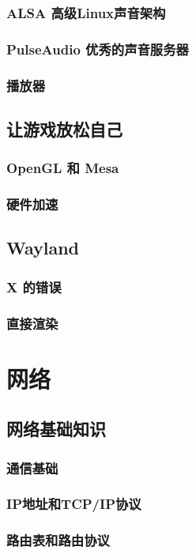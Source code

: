\documentclass[amstex]{ctexbook}
\begin{document}
\subsection{ ALSA 高级Linux声音架构}
\subsection{  PulseAudio 优秀的声音服务器	}
\subsection{  播放器	}
\section{  让游戏放松自己	}
\subsection{  OpenGL 和 Mesa	}
\subsection{  硬件加速	}
\section{  Wayland	}
\subsection{ X 的错误	}
\subsection{  直接渲染}

\chapter{网络}
\section{  网络基础知识}
\subsection{  通信基础}
\subsection{  IP地址和TCP/IP协议}
\subsection{  路由表和路由协议}
\end{document}
